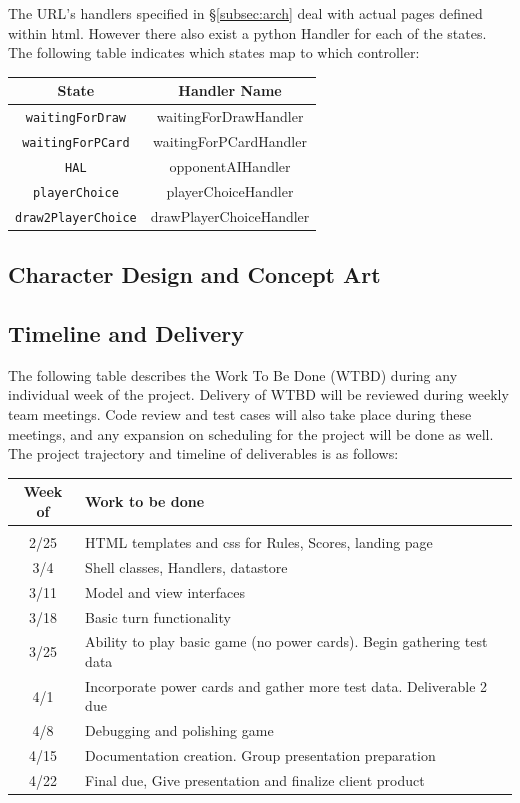 \documentclass[12pt]{IEEEtran}
\begin{document}
	The URL's handlers specified in \S\ref{subsec:arch} deal with actual pages defined within html. However there also exist a python Handler for each of the states. The following table indicates which states map to which controller:
	
	\begin{center}
		\begin{tabular}{| c | c |}\hline
			\multicolumn{1}{|c}{State} & \multicolumn{1}{c|}{ Handler Name }\\\hline
			\texttt{waitingForDraw} & waitingForDrawHandler\\\hline
			\texttt{waitingForPCard} & waitingForPCardHandler\\\hline
			\texttt{HAL} & opponentAIHandler\\\hline
			\texttt{playerChoice} & playerChoiceHandler\\\hline
			\texttt{draw2PlayerChoice} & drawPlayerChoiceHandler\\\hline
		\end{tabular}
	\end{center}

\subsection{Character Design and Concept Art}
\label{subsec:cdesign}

\subsection{Timeline and Delivery}
\label{subsec:timeline}

	The following table describes the Work To Be Done (WTBD) during any individual week of the project. Delivery of WTBD will be reviewed during weekly team meetings. Code review and test cases will also take place during these meetings, and any expansion on scheduling for the project will be done as well. The project trajectory and timeline of deliverables is as follows:

	\begin{center}
		\begin{tabular}{ c |  p{} }
			Week of & Work to be done\\\hline
			&\\
			2/25 & HTML templates and css for Rules, Scores, landing page\\
			3/4 & Shell classes, Handlers, datastore\\
			3/11 & Model and view interfaces\\
			3/18 & Basic turn functionality\\
			3/25 &  Ability to play basic game (no power cards). Begin gathering test data\\
			4/1 & Incorporate power cards and gather more test data. Deliverable 2 due\\
			4/8 & Debugging and polishing game\\
			4/15 & Documentation creation. Group presentation preparation\\
			4/22 & Final due, Give presentation and finalize client product\\
		\end{tabular}
	\end{center}
\end{document}
